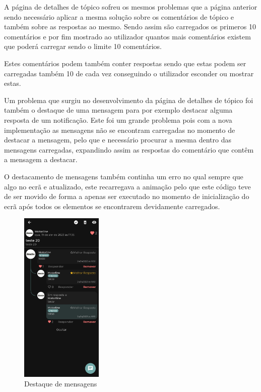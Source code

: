A página de detalhes de tópico sofreu os mesmos problemas que a página anterior sendo necessário aplicar a mesma solução sobre os comentários de tópico e também sobre as respostas ao mesmo. Sendo assim são carregados os primeros 10 comentários e por fim mostrado ao utilizador quantos mais comentários existem que poderá carregar sendo o limite 10 comentários.

Estes comentários podem também conter respostas sendo que estas podem ser carregadas também 10 de cada vez conseguindo o utilizador esconder ou mostrar estas.

Um problema que surgiu no desenvolvimento da página de detalhes de tópico foi também o destaque de uma mensagem para por exemplo destacar alguma resposta de um notificação. Este foi um grande problema pois com a nova implementação as mensagens não se encontram carregadas no momento de destacar a mensagem, pelo que e necessário procurar a mesma dentro das mensagens carregadas, expandindo assim as respostas do comentário que contêm a mensagem a destacar.

O destacamento de mensagens também continha um erro no qual sempre que algo no ecrã e atualizado, este recarregava a animação pelo que este código teve de ser movido de forma a apenas ser executado no momento de inicialização do ecrã após todos os elementos se encontrarem devidamente carregados.

\begin{figure}[htb]
  \centering
  \includegraphics[width=0.35\textwidth]{images/implementacao/frontend/forum/loading_topics/1686062701127.jpg}
  \caption{Destaque de mensagens}
  \label{fig:75}
\end{figure}